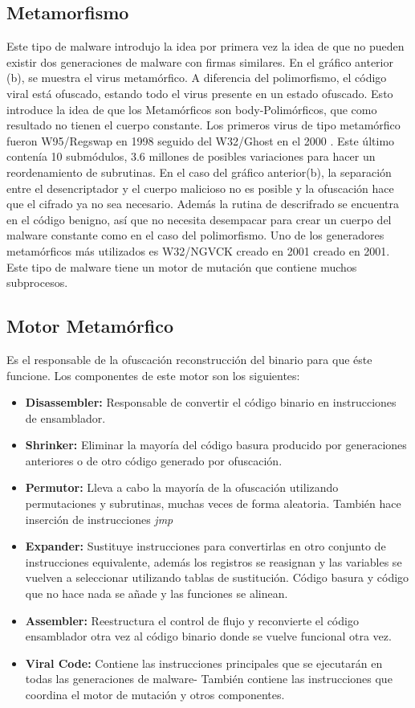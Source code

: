 \documentclass[15pt]{article}
\begin{document}
	\subsection{Metamorfismo}
	Este tipo de malware introdujo la idea por primera vez la idea de que no pueden existir dos generaciones de malware con firmas similares. En el gráfico anterior (b), se muestra el virus metamórfico. A diferencia del polimorfismo, el código viral está ofuscado, estando todo el virus presente en un estado ofuscado. Esto introduce la idea de que los Metamórficos son body-Polimórficos, que como resultado no tienen el cuerpo constante. Los primeros virus de tipo metamórfico fueron W95/Regswap en 1998 \cite{regswap} seguido del W32/Ghost en el 2000 \cite{ghost}. Este último contenía 10 submódulos, 3.6 millones de posibles variaciones para hacer un reordenamiento de subrutinas. En el caso del gráfico anterior(b), la separación entre el desencriptador y el cuerpo malicioso no es posible y la ofuscación  hace que el cifrado ya no sea necesario. Además la rutina de descrifrado se encuentra en el código benigno, así que no necesita desempacar para crear un cuerpo del malware constante como en el caso del polimorfismo. Uno de los generadores metamórficos más utilizados es W32/NGVCK creado en 2001 \cite{ngvck} creado en 2001. Este tipo de malware tiene un motor de mutación que contiene muchos subprocesos.
	
	\subsection{Motor Metamórfico}
	Es el responsable de la ofuscación reconstrucción del binario para que éste funcione. Los componentes de este motor son los siguientes:
	\begin{itemize}
		\item \textbf{Disassembler:} Responsable de convertir el código binario en instrucciones de ensamblador.
		\item \textbf{Shrinker:} Eliminar la mayoría del código basura producido por generaciones anteriores o de otro código generado por ofuscación.
		\item \textbf{Permutor:} Lleva a cabo la mayoría de la ofuscación utilizando permutaciones y subrutinas, muchas veces de forma aleatoria. También hace inserción de instrucciones \textit{jmp}
		\item \textbf{Expander:} Sustituye instrucciones para convertirlas en otro conjunto de instrucciones equivalente, además los registros se reasignan y las variables se vuelven a seleccionar utilizando tablas de sustitución. Código basura y código que no hace nada se añade y las funciones se alinean.
		\item \textbf{Assembler:} Reestructura el control de flujo y reconvierte el código ensamblador otra vez al código binario donde se vuelve funcional otra vez.
		\item \textbf{Viral Code:} Contiene las instrucciones principales que se ejecutarán en todas las generaciones de malware- También contiene las instrucciones que coordina el motor de mutación y otros componentes.    
	\end{itemize}
\end{document}

